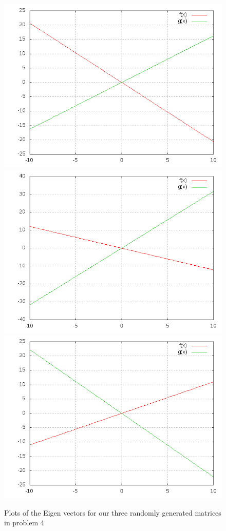 \documentclass[12pt]{article}
\begin{document}
\begin{figure}[H]
\includegraphics[scale=.35]{eigvec1.png}
\includegraphics[scale=.35]{eigvec2.png}
\includegraphics[scale=.35]{eigvec3.png}
\caption{Plots of the Eigen vectors for our three randomly generated matrices in problem 4}
\end{figure}
\end{document}

